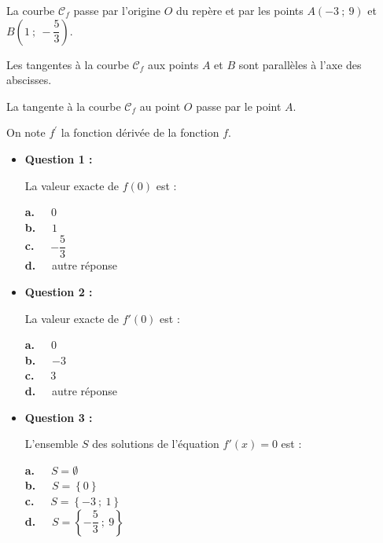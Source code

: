 \begin{center}
\end{center}
\par
La courbe $\mathscr{C}_{f}$ passe par l'origine $O$ du repère et par les points $A(-3~;~9)$ et $B\left(1~;~-\dfrac{5}{3}\right)$.
\par
Les tangentes à la courbe $\mathscr{C}_{f}$ aux points $A$ et $B$ sont parallèles à l'axe des abscisses.
\par
La tangente à la courbe $\mathscr{C}_{f}$ au point $O$ passe par le point $A$.
\par
\medskip
\par
On note $f^{\prime}$  la fonction dérivée de la fonction $f$.
\par
\begin{itemize}
     \item \textbf{Question 1 :}
     \par
     La valeur exacte de $f(0)$ est :
     \par
     \textbf{a.~~} $0$ \\
     \textbf{b.~~} $1$ \\
     \textbf{c.~~} $-\dfrac{5}{3}$ \\
     \textbf{d.~~} autre réponse \\
     \par
     \item \textbf{Question 2 :}
     \par
     La valeur exacte de $f'(0)$ est :
     \par
     \textbf{a.~~} $0$ \\
     \textbf{b.~~} $-3$ \\
     \textbf{c.~~} $3$ \\
     \textbf{d.~~} autre réponse \\
     \par
     \item \textbf{Question 3 :}
     \par
     L'ensemble $S$ des solutions de l'équation $f'(x)=0$ est :
     \par
     \textbf{a.~~} $S=\emptyset$ \\
     \textbf{b.~~} $S=\left\{0\right\}$  \\
     \textbf{c.~~} $S=\left\{-3~;~1\right\}$ \\
     \textbf{d.~~} $S=\left\{-\dfrac{5}{3}~;~9\right\}$ \\

\end{itemize}
